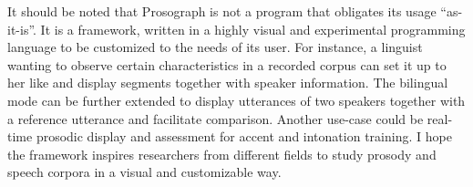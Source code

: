 It should be noted that Prosograph is not a program that obligates its usage ``as-it-is''. It is a framework, written in a highly visual and experimental programming language to be customized to the needs of its user. For instance, a linguist wanting to observe certain characteristics in a recorded corpus can set it up to her like and display segments together with speaker information. The bilingual mode can be further extended to display utterances of two speakers together with a reference utterance and facilitate comparison. Another use-case could be real-time prosodic display and assessment for accent and intonation training. I hope the framework inspires researchers from different fields to study prosody and speech corpora in a visual and customizable way. 